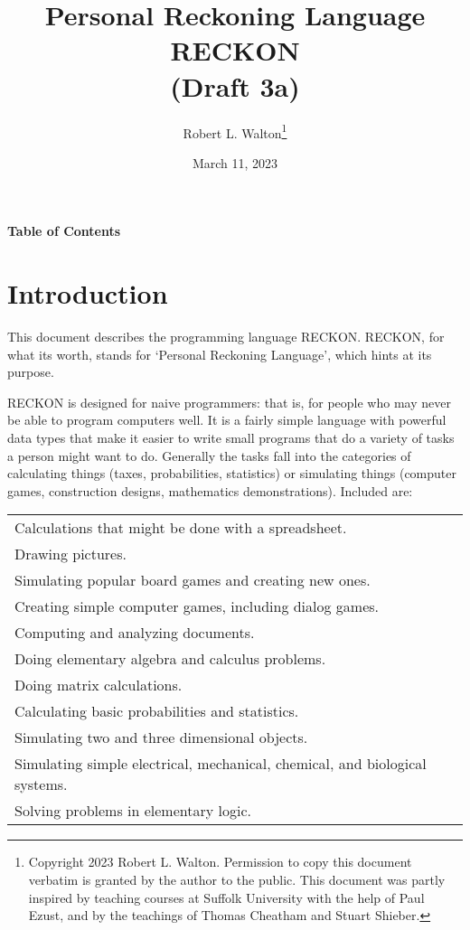 \documentclass[12pt]{article}
\makeatletter
\renewcommand\tableofcontents{%
    \begin{list}{}%
	     {\setlength{\itemsep}{0in}%
	      \setlength{\topsep}{0in}%
	      \setlength{\parsep}{1ex}%
	      \setlength{\labelwidth}{0in}%
	      \setlength{\baselineskip}{1.5ex}%
	      \setlength{\leftmargin}{0.8in}%
	      \setlength{\rightmargin}{0.8in}}%
    \item\@starttoc{toc}%
    \end{list}}
\makeatother
\begin{document}
        
\title{Personal Reckoning Language\\[2ex]
       RECKON\\[2ex]
       (Draft 3a)}

\author{Robert L. Walton\thanks{Copyright 2023 Robert L. Walton.
Permission to copy this document verbatim is granted by the author
to the public.  This document was partly inspired
by teaching courses at Suffolk University with the help of
Paul Ezust, and by the teachings of Thomas
Cheatham and Stuart Shieber.}}

\date{March 11, 2023}

\maketitle

\newpage
\begin{center}
\large \bf Table of Contents
\end{center}

\bigskip

\tableofcontents 

\newpage

\section{Introduction}

This document describes the programming language RECKON.  RECKON,
for what its worth, stands for `Personal Reckoning Language',
which hints at its purpose.

RECKON is designed for naive programmers: that is, for people who may never
be able to program computers well.  It is a fairly simple language with
powerful data types that make it easier to write small programs
that do a variety of tasks a person might want to do.  Generally
the tasks fall into the categories of calculating things (taxes,
probabilities, statistics) or simulating things
(computer games, construction designs, mathematics demonstrations).
Included are:

\begin{center}
\begin{tabular}{l}
Calculations that might be done with a spreadsheet. \\
Drawing pictures. \\
Simulating popular board games and creating new ones. \\
Creating simple computer games, including dialog games. \\
Computing and analyzing documents. \\
Doing elementary algebra and calculus problems. \\
Doing matrix calculations. \\ 
Calculating basic probabilities and statistics. \\
Simulating two and three dimensional objects. \\
Simulating simple electrical, mechanical, chemical, and biological systems.\\
Solving problems in elementary logic. \\
\end{tabular}
\end{center}
\end{document}
